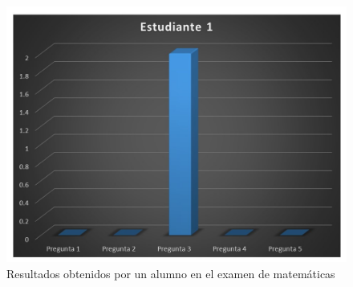 \documentclass[12pt] {report}
\begin{document}
\begin{figure}[H]
\centering 
\includegraphics[scale=.4]{MEstudiante1.JPG}
\caption{Resultados obtenidos por un alumno en el examen de matemáticas}
\end{figure}
\end{document}
